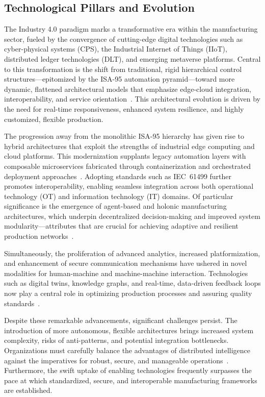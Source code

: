 \documentclass[sigconf]{acmart}
\begin{document}
\subsection{Technological Pillars and Evolution}

The Industry 4.0 paradigm marks a transformative era within the manufacturing sector, fueled by the convergence of cutting-edge digital technologies such as cyber-physical systems (CPS), the Industrial Internet of Things (IIoT), distributed ledger technologies (DLT), and emerging metaverse platforms. Central to this transformation is the shift from traditional, rigid hierarchical control structures—epitomized by the ISA-95 automation pyramid—toward more dynamic, flattened architectural models that emphasize edge-cloud integration, interoperability, and service orientation~\cite{ref1,ref9,ref11,ref16,ref18,ref27,ref30,ref37,ref38,ref44,ref45,ref57,ref59}. This architectural evolution is driven by the need for real-time responsiveness, enhanced system resilience, and highly customized, flexible production.

The progression away from the monolithic ISA-95 hierarchy has given rise to hybrid architectures that exploit the strengths of industrial edge computing and cloud platforms. This modernization supplants legacy automation layers with composable microservices fabricated through containerization and orchestrated deployment approaches~\cite{ref1}. Adopting standards such as IEC~61499 further promotes interoperability, enabling seamless integration across both operational technology (OT) and information technology (IT) domains. Of particular significance is the emergence of agent-based and holonic manufacturing architectures, which underpin decentralized decision-making and improved system modularity—attributes that are crucial for achieving adaptive and resilient production networks~\cite{ref11,ref37}.

Simultaneously, the proliferation of advanced analytics, increased platformization, and enhancement of secure communication mechanisms have ushered in novel modalities for human-machine and machine-machine interaction. Technologies such as digital twins, knowledge graphs, and real-time, data-driven feedback loops now play a central role in optimizing production processes and assuring quality standards~\cite{ref9,ref18,ref21,ref44}. 

Despite these remarkable advancements, significant challenges persist. The introduction of more autonomous, flexible architectures brings increased system complexity, risks of anti-patterns, and potential integration bottlenecks. Organizations must carefully balance the advantages of distributed intelligence against the imperatives for robust, secure, and manageable operations~\cite{ref11,ref59,ref92}. Furthermore, the swift uptake of enabling technologies frequently surpasses the pace at which standardized, secure, and interoperable manufacturing frameworks are established.
\end{document}

